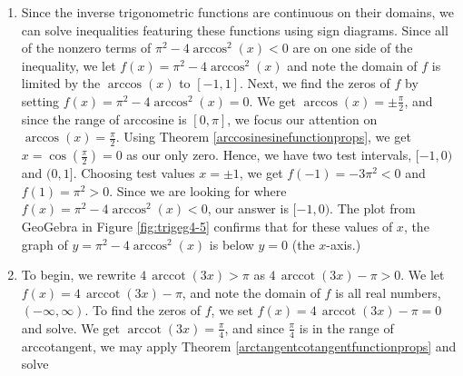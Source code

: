 {\begin{enumerate}
\[\begin{array}{rclr}
\arctan(x) & = & -\frac{\pi}{4} & \\ [5pt]
\tan(\arctan(x)) & = & \tan\left(-\frac{\pi}{4}\right) & \\ [5pt]
x & = & -1 & \text{Since $\tan(\arctan(u)) = u$.} \\ \end{array}\]

Plotting in GeoGebra verifies our result: see Figure \ref{fig:trigeg4-4}.



\item Since the inverse trigonometric functions are continuous on their domains, we can solve inequalities featuring these functions using sign diagrams. Since all of the nonzero terms of  $\pi^2-4\arccos^{2}(x) < 0$ are on one side of the inequality, we let $f(x) = \pi^2-4\arccos^{2}(x)$ and note the domain of $f$ is limited by the $\arccos(x)$ to $[-1,1]$.  Next, we find the zeros of $f$ by setting $f(x) = \pi^2-4\arccos^{2}(x) = 0$.  We get $\arccos(x) = \pm \frac{\pi}{2}$, and since the range of arccosine is $[0,\pi]$, we focus our attention on $\arccos(x) = \frac{\pi}{2}$.  Using Theorem \ref{arccosinesinefunctionprops}, we get $x = \cos\left(\frac{\pi}{2}\right) = 0$ as our only zero.  Hence, we have two test intervals, $[-1,0)$ and $(0,1]$.  Choosing test values $x = \pm 1$, we get $f(-1) = -3\pi^2 < 0$ and $f(1) = \pi^2 > 0$.  Since we are looking for where $f(x) = \pi^2-4\arccos^{2}(x) < 0$, our answer is $[-1,0)$.  The plot from GeoGebra in Figure \ref{fig:trigeg4-5} confirms that for these values of $x$, the graph of $y = \pi^2-4\arccos^{2}(x)$ is below $y = 0$ (the $x$-axis.)





\item   To begin, we rewrite $4 \, \operatorname{arccot}(3x) > \pi$ as $4 \, \operatorname{arccot}(3x) -  \pi > 0$.  We let $f(x) = 4 \, \operatorname{arccot}(3x) -  \pi$, and note the domain of $f$ is all real numbers, $(-\infty, \infty)$.  To find the zeros of $f$, we set $f(x) = 4 \, \operatorname{arccot}(3x) -  \pi = 0$ and solve.  We get $\operatorname{arccot}(3x) = \frac{\pi}{4}$, and since $\frac{\pi}{4}$ is in the range of arccotangent, we may apply Theorem \ref{arctangentcotangentfunctionprops} and solve 


\end{enumerate}}
